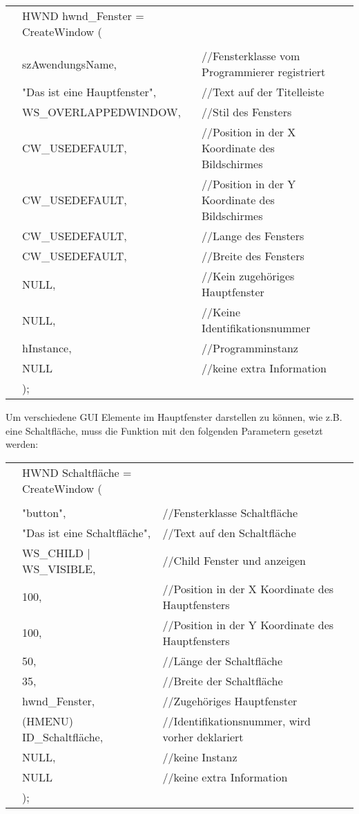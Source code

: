 \begin{tabular}{llll}
& HWND hwnd\_Fenster = CreateWindow (\\
\\
& szAwendungsName,					& //Fensterklasse vom Programmierer registriert\\                            
& "Das ist eine Hauptfenster",  	& //Text auf der Titelleiste\\                                
& WS\_OVERLAPPEDWINDOW,              & //Stil des Fensters\\                         
& CW\_USEDEFAULT,                    & //Position in der X Koordinate des Bildschirmes\\     
& CW\_USEDEFAULT,                    & //Position in der Y Koordinate des Bildschirmes\\     
& CW\_USEDEFAULT,                    & //Lange des Fensters\\                                  
& CW\_USEDEFAULT,                    & //Breite des Fensters\\                                 
& NULL,                              & //Kein zugehöriges Hauptfenster\\                           
& NULL,                              & //Keine Identifikationsnummer\\                               
& hInstance,                         & //Programminstanz\\                                 
& NULL                               & //keine extra Information\\  
& );                          
\end{tabular}                        
Um verschiedene GUI Elemente im Hauptfenster darstellen zu können, wie z.B. eine Schaltfläche, muss die Funktion mit den folgenden Parametern gesetzt werden:
\\
\begin{tabular}{llll}
& HWND Schaltfläche = CreateWindow (\\
\\
& "button",					& //Fensterklasse Schaltfläche\\
& "Das ist eine Schaltfläche",		& //Text auf den Schaltfläche\\
& WS\_CHILD | WS\_VISIBLE,	& //Child Fenster und anzeigen\\
& 100,						& //Position in der X Koordinate des Hauptfensters\\
& 100,						& //Position in der Y Koordinate des Hauptfensters\\
& 50,						& //Länge der Schaltfläche\\
& 35,						& //Breite der Schaltfläche\\
& hwnd\_Fenster,				& //Zugehöriges Hauptfenster\\
& (HMENU) ID\_Schaltfläche,			& //Identifikationsnummer, wird vorher deklariert\\
& NULL,						& //keine Instanz\\
& NULL						& //keine extra Information\\
& );
\end{tabular}

